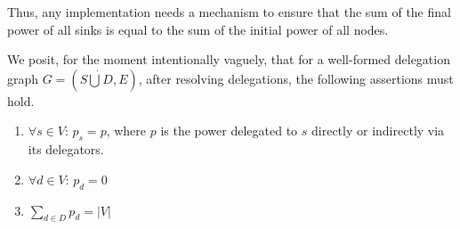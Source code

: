  Thus, any implementation needs a mechanism to ensure that the sum of the final power of all sinks is equal to the sum of the initial power of all nodes.
 
 We posit, for the moment intentionally vaguely, that for a well-formed delegation graph $G=(S \dot\bigcup D, E)$, after resolving delegations, the following assertions must hold.

\begin{enumerate}
\item $\forall s \in V$: $p_s = p$, where $p$ is the power delegated to $s$ directly or indirectly via its delegators.
\item $\forall d \in V$: $p_d = 0$ 
\item $\sum_{d \in D} p_d = |V|$
\end{enumerate}


